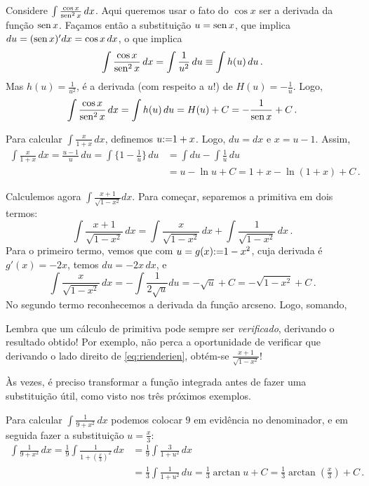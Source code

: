 \begin{ex}
Considere $\int \frac{\cos x}{\operatorname{sen}^2x}\,dx$. Aqui queremos usar o fato do
$\cos x$ ser a derivada da função $\operatorname{sen} x$. Façamos então a {substituição}
$u=\operatorname{sen} x$, que implica $du=(\operatorname{sen} x)'dx=\cos x\,dx$, o que implica
$$\int \frac{\cos x}{\operatorname{sen}^2x}\,dx=\int \frac{1}{u^2}\,du\equiv \int
h(u)\,du\,.$$ 
Mas $h(u)=\tfrac{1}{u^2}$, é a derivada (com respeito a $u$!) de 
$H(u)=-\frac{1}{u}$. Logo, 
$$\int \frac{\cos x}{\operatorname{sen}^2x}\,dx=\int h(u)\,du=
H(u)+C=-\frac{1}{\operatorname{sen} x}+C\,.$$
\end{ex}

\begin{ex}
Para calcular $\int \frac{x}{1+x}\,dx$, definemos $u{:=} 1+x$. Logo, $du=dx$
e $x=u-1$. Assim,
\begin{align*}
\int\frac{x}{1+x}\,dx=\frac{u-1}{u}\,du=\int\bigl\{1-\tfrac{1}{u}\bigr\}\,du
&=\int du-\int\tfrac{1}{u}\,du\\
&=u-\ln u+C=1+x-\ln(1+x)+C\,.
\end{align*}
\end{ex}

\begin{ex}
Calculemos agora $\int\frac{x+1}{\sqrt{1-x^2}}dx$.
Para começar, separemos a primitiva em dois termos:
$$
\int\frac{x+1}{\sqrt{1-x^2}}\,dx=\int\frac{x}{\sqrt{1-x^2}}\,dx+\int\frac{1}{
\sqrt {1-x^2}}\,dx\,.
$$
Para o primeiro termo, vemos que com $u=g(x){:=} 1-x^2$, cuja derivada é
$g'(x)=-2x$, temos $du=-2x\,dx$, e
$$
\int\frac{x}{\sqrt{1-x^2}}\,dx=
-\int \frac{1}{2\sqrt{u}}du=-\sqrt{u}+C=-\sqrt{1-x^2}+C\,.$$
No segundo termo reconhecemos a derivada da função arcseno. Logo, somando,
\end{ex}

\begin{obs}
Lembra que um cálculo de primitiva pode sempre
ser \emph{verificado}, derivando o resultado obtido! Por exemplo, não
perca a oportunidade de verificar que derivando o lado direito de
\eqref{eq:rienderien}, obtém-se $\frac{x+1}{\sqrt{1-x^2}}$!
\end{obs}

Às vezes, é preciso transformar a função integrada antes de fazer
uma substituição útil, como visto nos três próximos exemplos.

\begin{ex}
Para calcular $\int \frac{1}{9+x^2}\,dx$
podemos colocar $9$ em evidência no denominador, e em seguida fazer a
substituição $u=\tfrac{x}{3}$:
\begin{align*}\int \frac{1}{9+x^2}\,dx=
\tfrac19\int \frac{1}{1+(\tfrac{x}{3})^2}\,dx&=\tfrac19
\int\frac{3}{1+u^2}\,dx\\
&=\tfrac13\int \frac{1}{1+u^2}\,du =\tfrac13\arctan u+C
=\tfrac13\arctan(\tfrac{x}{3})+C\,.
\end{align*}
\end{ex}


